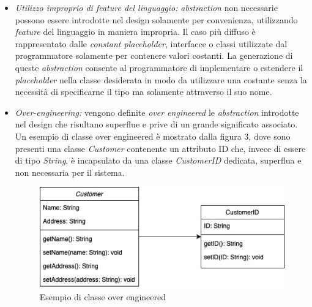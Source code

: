     \begin{itemize}
        \item \textit{Utilizzo improprio di feature del linguaggio:}
        \textit{abstraction} non necessarie possono essere introdotte nel design solamente per convenienza, utilizzando \textit{feature} del linguaggio in maniera impropria. Il caso più diffuso è rappresentato dalle \textit{constant placeholder}, interfacce o classi utilizzate dal programmatore solamente per contenere valori costanti.
        La generazione di queste \textit{abstraction} consente al programmatore di implementare o estendere il \textit{placeholder} nella classe desiderata in modo da utilizzare una costante senza la necessità di specificarne il tipo ma solamente attraverso il suo nome.
        
        \item \textit{Over-engineering:} vengono definite \textit{over engineered} le \textit{abstraction} introdotte nel design che risultano superflue e prive di un grande significato associato. 
        Un esempio di classe over engineered è mostrato dalla figura 3, dove sono presenti una classe \textit{Customer} contenente un attributo ID che, invece di essere di tipo \textit{String}, è incapsulato da una classe \textit{CustomerID} dedicata, superflua e non necessaria per il sistema.
        \begin{figure}[h]
            \centering
            \includegraphics[scale=0.45]{Tesi/Sezione3-RiconoscimentoSmell/immagini/Untitled Diagram.jpg}
            \caption{Esempio di classe over engineered}
            \label{fig:my_label}
        \end{figure}
        

\end{itemize}
